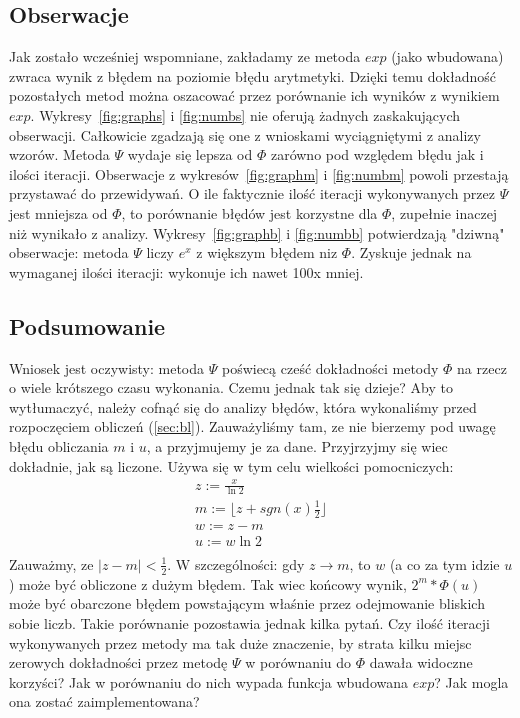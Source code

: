 \documentclass[11pt,wide]{mwart}
\begin{document}
\subsection{Obserwacje}
Jak zostało wcześniej wspomniane, zakładamy ze metoda $exp$ (jako wbudowana) zwraca wynik z błędem na poziomie błędu arytmetyki. Dzięki temu dokładność pozostałych metod można oszacować przez porównanie ich wyników z wynikiem $exp$.
Wykresy~\ref{fig:graphs} i \ref{fig:numbs} nie oferują żadnych zaskakujących obserwacji. Całkowicie zgadzają się one z wnioskami wyciągniętymi z analizy wzorów. Metoda $\Psi$ wydaje się lepsza od $\Phi$ zarówno pod względem błędu jak i ilości iteracji.
Obserwacje z wykresów~\ref{fig:graphm} i \ref{fig:numbm} powoli przestają przystawać do przewidywań. O ile faktycznie ilość iteracji wykonywanych przez $\Psi$ jest mniejsza od $\Phi$, to porównanie błędów jest korzystne dla $\Phi$, zupełnie inaczej niż wynikało z analizy.
Wykresy~\ref{fig:graphb} i \ref{fig:numbb} potwierdzają "dziwną" obserwacje: metoda $\Psi$ liczy $e^x$ z większym błędem niz $\Phi$. Zyskuje jednak na wymaganej ilości iteracji: wykonuje ich nawet 100x mniej.
\subsection{Podsumowanie}
Wniosek jest oczywisty: metoda $\Psi$ poświecą cześć dokładności metody $\Phi$ na rzecz o wiele krótszego czasu wykonania. Czemu jednak tak się dzieje? Aby to wytłumaczyć, należy cofnąć się do analizy błędów, która wykonaliśmy przed rozpoczęciem obliczeń (\ref{sec:bl}). Zauważyliśmy tam, ze nie bierzemy pod uwagę błędu obliczania $m$ i $u$, a przyjmujemy je za dane. Przyjrzyjmy się wiec dokładnie, jak są liczone. Używa się w tym celu wielkości pomocniczych:
\begin{gather}
  z := \frac{x}{\ln 2}\\
  m := \lfloor z + sgn(x)\frac{1}{2} \rfloor\\
  w := z - m\\
  u := w\ln 2\\
\end{gather}
Zauważmy, ze  $|z - m| < \frac{1}{2}$. W szczególności: gdy $z\rightarrow m$, to $w$ (a co za tym idzie $u$) może być obliczone z dużym błędem. Tak wiec końcowy wynik, $2^m*\Phi(u)$ może być obarczone błędem powstającym właśnie przez odejmowanie bliskich sobie liczb.
\indent Takie porównanie pozostawia jednak kilka pytań. Czy  ilość iteracji wykonywanych przez metody ma tak duże znaczenie, by strata kilku miejsc zerowych dokładności przez metodę $\Psi$ w porównaniu do $\Phi$ dawała widoczne korzyści? Jak w porównaniu do nich wypada funkcja wbudowana $exp$? Jak mogla ona zostać zaimplementowana?
\end{document}
